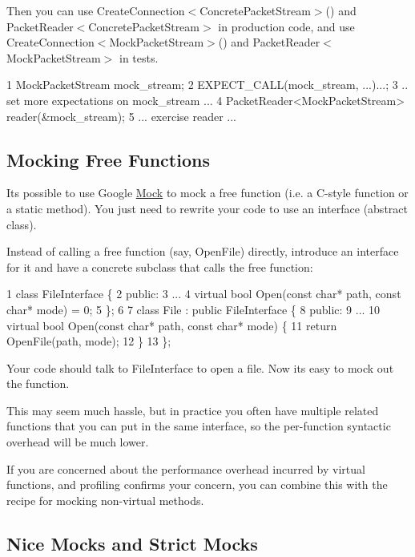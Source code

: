 Then you can use {\ttfamily Create\+Connection$<$Concrete\+Packet\+Stream$>$()} and {\ttfamily Packet\+Reader$<$Concrete\+Packet\+Stream$>$} in production code, and use {\ttfamily Create\+Connection$<$Mock\+Packet\+Stream$>$()} and {\ttfamily Packet\+Reader$<$Mock\+Packet\+Stream$>$} in tests.


\begin{DoxyCode}
1 MockPacketStream mock\_stream;
2 EXPECT\_CALL(mock\_stream, ...)...;
3 .. set more expectations on mock\_stream ...
4 PacketReader<MockPacketStream> reader(&mock\_stream);
5 ... exercise reader ...
\end{DoxyCode}


\subsection*{Mocking Free Functions}

It\textquotesingle{}s possible to use Google \hyperlink{class_mock}{Mock} to mock a free function (i.\+e. a C-\/style function or a static method). You just need to rewrite your code to use an interface (abstract class).

Instead of calling a free function (say, {\ttfamily Open\+File}) directly, introduce an interface for it and have a concrete subclass that calls the free function\+:


\begin{DoxyCode}
1 class FileInterface \{
2  public:
3   ...
4   virtual bool Open(const char* path, const char* mode) = 0;
5 \};
6 
7 class File : public FileInterface \{
8  public:
9   ...
10   virtual bool Open(const char* path, const char* mode) \{
11     return OpenFile(path, mode);
12   \}
13 \};
\end{DoxyCode}


Your code should talk to {\ttfamily File\+Interface} to open a file. Now it\textquotesingle{}s easy to mock out the function.

This may seem much hassle, but in practice you often have multiple related functions that you can put in the same interface, so the per-\/function syntactic overhead will be much lower.

If you are concerned about the performance overhead incurred by virtual functions, and profiling confirms your concern, you can combine this with the recipe for mocking non-\/virtual methods.

\subsection*{Nice Mocks and Strict Mocks}

